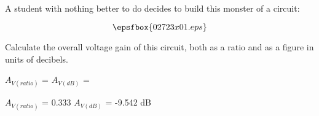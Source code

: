 

A student with nothing better to do decides to build this monster of a circuit:

$$\epsfbox{02723x01.eps}$$

Calculate the overall voltage gain of this circuit, both as a ratio and as a figure in units of decibels.

\vskip 10pt

$A_{V(ratio)}$ = \hskip 80pt $A_{V(dB)}$ =







$A_{V(ratio)}$ = 0.333 \hskip 30pt $A_{V(dB)}$ = -9.542 dB











